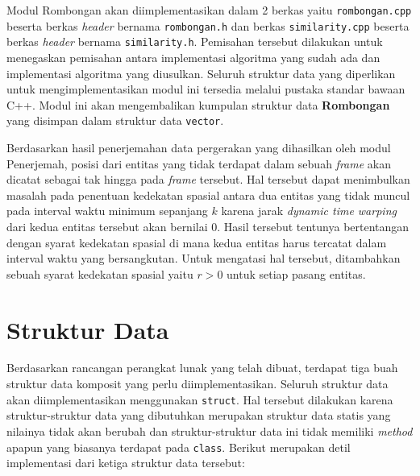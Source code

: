 Modul Rombongan akan diimplementasikan dalam 2 berkas yaitu \texttt{rombongan.cpp} beserta berkas \textit{header} bernama \texttt{rombongan.h} dan berkas \texttt{similarity.cpp} beserta berkas \textit{header} bernama \texttt{similarity.h}. Pemisahan tersebut dilakukan untuk menegaskan pemisahan antara implementasi algoritma yang sudah ada dan implementasi algoritma yang diusulkan. Seluruh struktur data yang diperlikan untuk mengimplementasikan modul ini tersedia melalui pustaka standar bawaan C++. Modul ini akan mengembalikan kumpulan struktur data \textbf{Rombongan} yang disimpan dalam struktur data \texttt{vector}.

Berdasarkan hasil penerjemahan data pergerakan yang dihasilkan oleh modul Penerjemah, posisi dari entitas yang tidak terdapat dalam sebuah \textit{frame} akan dicatat sebagai tak hingga pada \textit{frame} tersebut. Hal tersebut dapat menimbulkan masalah pada penentuan kedekatan spasial antara dua entitas yang tidak muncul pada interval waktu minimum sepanjang $k$ karena jarak \textit{dynamic time warping} dari kedua entitas tersebut akan bernilai 0. Hasil tersebut tentunya bertentangan dengan syarat kedekatan spasial di mana kedua entitas harus tercatat dalam interval waktu yang bersangkutan. Untuk mengatasi hal tersebut, ditambahkan sebuah syarat kedekatan spasial yaitu $r > 0$ untuk setiap pasang entitas. 

\section{Struktur Data}
\label{sec:impl-struct}

Berdasarkan rancangan perangkat lunak yang telah dibuat, terdapat tiga buah struktur data komposit yang perlu diimplementasikan. Seluruh struktur data akan diimplementasikan menggunakan \texttt{struct}. Hal tersebut dilakukan karena struktur-struktur data yang dibutuhkan merupakan struktur data statis yang nilainya tidak akan berubah dan struktur-struktur data ini tidak memiliki \textit{method} apapun yang biasanya terdapat pada \texttt{class}. Berikut merupakan detil implementasi dari ketiga struktur data tersebut:

